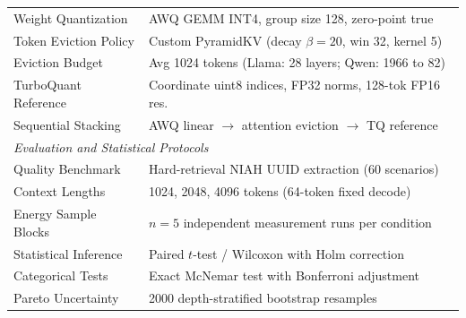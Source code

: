 \begin{table}[htbp]
{\begin{tabular}{@{}ll@{}}
Weight Quantization & AWQ GEMM INT4, group size 128, zero-point true \\
Token Eviction Policy & Custom PyramidKV (decay $\beta=20$, win 32, kernel 5) \\
Eviction Budget & Avg 1024 tokens (Llama: 28 layers; Qwen: 1966 to 82) \\
TurboQuant Reference & Coordinate uint8 indices, FP32 norms, 128-tok FP16 res. \\
Sequential Stacking & AWQ linear $\to$ attention eviction $\to$ TQ reference \\
\midrule
\multicolumn{2}{l}{\textit{Evaluation and Statistical Protocols}} \\
Quality Benchmark & Hard-retrieval NIAH UUID extraction (60 scenarios) \\
Context Lengths & 1024, 2048, 4096 tokens (64-token fixed decode) \\
Energy Sample Blocks & $n=5$ independent measurement runs per condition \\
Statistical Inference & Paired $t$-test / Wilcoxon with Holm correction \\
Categorical Tests & Exact McNemar test with Bonferroni adjustment \\
Pareto Uncertainty & 2000 depth-stratified bootstrap resamples \\
\bottomrule
\end{tabular}}
\end{table}
